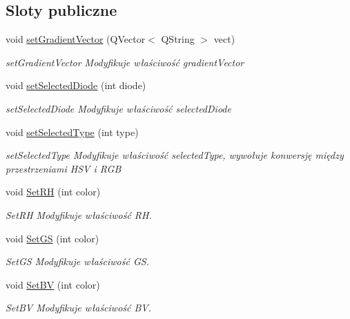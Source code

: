 \subsection*{Sloty publiczne}
\begin{DoxyCompactItemize}
\item 
void \mbox{\hyperlink{class_gradient_view_model_a44a264b3dfb259c75107dd80b1d7e389}{set\+Gradient\+Vector}} (Q\+Vector$<$ Q\+String $>$ vect)
\begin{DoxyCompactList}\small\item\em set\+Gradient\+Vector Modyfikuje właściwość gradient\+Vector \end{DoxyCompactList}\item 
void \mbox{\hyperlink{class_gradient_view_model_a17f428fa2bb8885ecf5e712e1d35c7a8}{set\+Selected\+Diode}} (int diode)
\begin{DoxyCompactList}\small\item\em set\+Selected\+Diode Modyfikuje właściwość selected\+Diode \end{DoxyCompactList}\item 
void \mbox{\hyperlink{class_gradient_view_model_ad90c266ab078a0701788f2a7a9c7f2be}{set\+Selected\+Type}} (int type)
\begin{DoxyCompactList}\small\item\em set\+Selected\+Type Modyfikuje właściwość selected\+Type, wywołuje konwersję między przestrzeniami H\+SV i R\+GB \end{DoxyCompactList}\item 
void \mbox{\hyperlink{class_gradient_view_model_a1a5a60c3fb1224b70203f811747043c1}{Set\+RH}} (int color)
\begin{DoxyCompactList}\small\item\em Set\+RH Modyfikuje właściwość RH. \end{DoxyCompactList}\item 
void \mbox{\hyperlink{class_gradient_view_model_a2b2cd55164016c051b0784396b51c0eb}{Set\+GS}} (int color)
\begin{DoxyCompactList}\small\item\em Set\+GS Modyfikuje właściwość GS. \end{DoxyCompactList}\item 
void \mbox{\hyperlink{class_gradient_view_model_a20989bc2daaea85e5cc33513af1b2660}{Set\+BV}} (int color)
\begin{DoxyCompactList}\small\item\em Set\+BV Modyfikuje właściwość BV. \end{DoxyCompactList}\end{DoxyCompactItemize}
